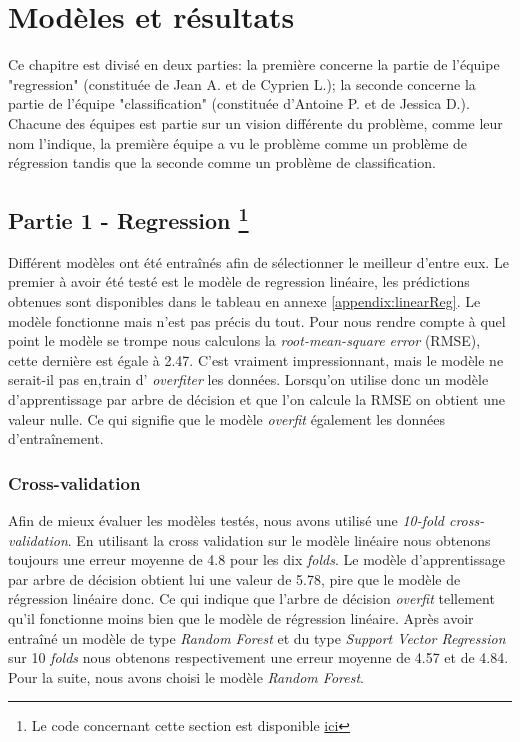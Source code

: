 \chapter{Modèles et résultats}
Ce chapitre est divisé en deux parties: la première concerne la partie de l'équipe "regression" (constituée de Jean A. et de Cyprien L.); la seconde concerne la partie de l'équipe "classification" (constituée d'Antoine P. et de Jessica D.). Chacune des équipes est partie sur un vision différente du problème, comme leur nom l'indique, la première équipe a vu le problème comme un problème de régression tandis que la seconde comme un problème de classification.

\section[Partie 1 - Regression]{Partie 1 - Regression \footnote{Le code concernant cette section est disponible \href{https://github.com/jalbrecq/CanYouCatchIt/blob/main/machine_learning/notebook/CanYouCatchIt_3of3.ipynb}{ici}}}

Différent modèles ont été entraînés afin de sélectionner le meilleur d'entre eux. Le premier à avoir été testé est le modèle de regression linéaire, les prédictions obtenues sont disponibles dans le tableau en annexe \ref{appendix:linearReg}. Le modèle fonctionne mais n'est pas précis du tout. Pour nous rendre compte à quel point le modèle se trompe nous calculons la  \textit{root-mean-square error} (RMSE), cette dernière est égale à 2.47. C'est vraiment impressionnant, mais le modèle ne serait-il pas en,train d' \textit{overfiter} les données. Lorsqu'on utilise donc un modèle d'apprentissage par arbre de décision et que l'on calcule la RMSE on obtient une valeur nulle. Ce qui signifie que le modèle \textit{overfit} également les données d'entraînement.

\subsection{Cross-validation}
Afin de mieux évaluer les modèles testés, nous avons utilisé une \textit{10-fold cross-validation}. En utilisant la cross validation sur le modèle linéaire nous obtenons toujours une erreur moyenne de 4.8 pour les dix \textit{folds}. Le modèle d'apprentissage par arbre de décision obtient lui une valeur de 5.78, pire que le modèle de régression linéaire donc. Ce qui indique que l'arbre de décision \textit{overfit} tellement qu'il fonctionne moins bien que le modèle de régression linéaire. Après avoir entraîné un modèle de type \textit{Random Forest} et du type \textit{Support Vector Regression} sur 10 \textit{folds} nous obtenons respectivement une erreur moyenne de 4.57 et de 4.84. Pour la suite, nous avons choisi le modèle \textit{Random Forest}.

